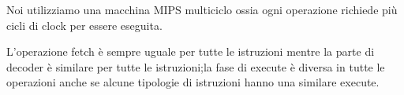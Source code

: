 Noi utilizziamo una macchina MIPS multiciclo ossia ogni operazione richiede più cicli di clock
per essere eseguita.

L'operazione fetch è sempre uguale per tutte le istruzioni mentre la parte di decoder
è similare per tutte le istruzioni;la fase di execute è diversa in tutte le operazioni
anche se alcune tipologie di istruzioni hanno una similare execute.
